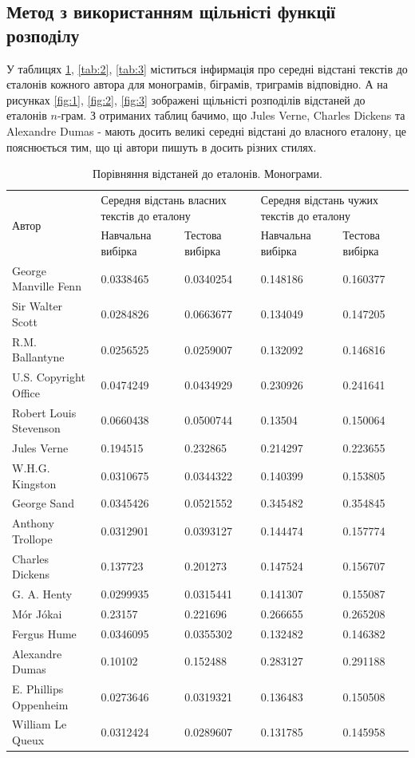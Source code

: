 \documentclass[12pt, a4paper]{extarticle}
\begin{document}
\subsection{Метод з використанням щільністі функції розподілу}
У таблицях \ref{tab:1}, \ref{tab:2}, \ref{tab:3} міститься інфирмація про середні відстані текстів до єталонів кожного автора для монограмів, біграмів, триграмів відповідно. А на рисунках \ref{fig:1}, \ref{fig:2}, \ref{fig:3} зображені щільністі розподілів відстаней до еталонів $n$-грам. З отриманих таблиц бачимо, що Jules Verne, Charles Dickens та Alexandre Dumas - мають досить великі середні відстані до власного еталону, це  пояснюється тим, що ці автори пишуть в досить різних стилях.
\begin{center}
\begin{table}
\begin{tabular}{|p{11em}|p{5em}|p{5em}|p{5em}|p{5em}|}
\hline
\multirow{2}{4em}{Автор} & \multicolumn{2}{|p{10em}|}{Середня відстань власних текстів до еталону} & \multicolumn{2}{|p{10em}|}{Середня відстань чужих текстів до еталону} \\
\cline{2-5}
& Навчальна вибірка & Тестова вибірка & Навчальна вибірка & Тестова вибірка\\
\hline
George Manville Fenn & 0.0338465 & 0.0340254 & 0.148186 & 0.160377\\
Sir Walter Scott & 0.0284826 & 0.0663677 & 0.134049 & 0.147205\\
R.M. Ballantyne & 0.0256525 & 0.0259007 & 0.132092 & 0.146816\\
U.S. Copyright Office & 0.0474249 & 0.0434929 & 0.230926 & 0.241641\\
Robert Louis Stevenson & 0.0660438 & 0.0500744 & 0.13504 & 0.150064\\
Jules Verne & 0.194515 & 0.232865 & 0.214297 & 0.223655\\
W.H.G. Kingston & 0.0310675 & 0.0344322 & 0.140399 & 0.153805\\
George Sand & 0.0345426 & 0.0521552 & 0.345482 & 0.354845\\
Anthony Trollope & 0.0312901 & 0.0393127 & 0.144474 & 0.157774\\
Charles Dickens & 0.137723 & 0.201273 & 0.147524 & 0.156707\\
G. A. Henty & 0.0299935 & 0.0315441 & 0.141307 & 0.155087\\
Mór Jókai & 0.23157 & 0.221696 & 0.266655 & 0.265208\\
Fergus Hume & 0.0346095 & 0.0355302 & 0.132482 & 0.146382\\
Alexandre Dumas & 0.10102 & 0.152488 & 0.283127 & 0.291188\\
E. Phillips Oppenheim & 0.0273646 & 0.0319321 & 0.136483 & 0.150508\\
William Le Queux & 0.0312424 & 0.0289607 & 0.131785 & 0.145958\\
\hline
\end{tabular}
\caption{Порівняння відстаней до еталонів. Монограми.}
\label{tab:1}
\end{table}
\end{center}
\end{document}
